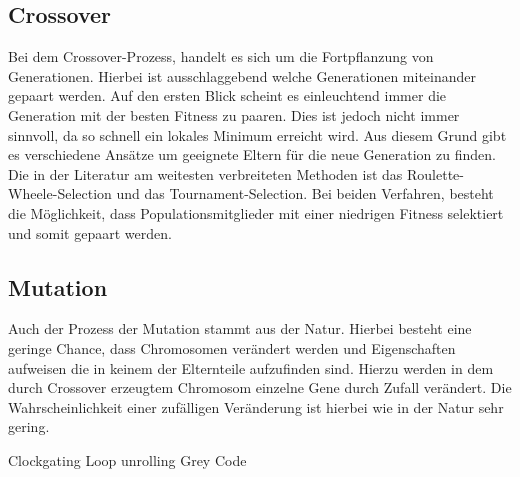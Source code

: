 \subsection{Crossover}
\label{chap:grundlagen_cossover}
Bei dem Crossover-Prozess, handelt es sich um die Fortpflanzung von Generationen. Hierbei ist ausschlaggebend welche Generationen miteinander gepaart werden. Auf den ersten Blick scheint es einleuchtend immer die Generation mit der besten Fitness zu paaren. Dies ist jedoch nicht immer sinnvoll, da so schnell ein lokales Minimum erreicht wird. Aus diesem Grund gibt es verschiedene Ansätze um geeignete Eltern für die neue Generation zu finden.\cite{davis1991handbook}
Die in der Literatur am weitesten verbreiteten Methoden ist das Roulette-Wheele-Selection und das Tournament-Selection.\cite{zhong2005comparison} Bei beiden Verfahren, besteht die Möglichkeit, dass Populationsmitglieder mit einer niedrigen Fitness selektiert und somit gepaart werden.

\subsection{Mutation}
Auch der Prozess der Mutation stammt aus der Natur. Hierbei besteht eine geringe Chance, dass Chromosomen verändert werden und Eigenschaften aufweisen die in keinem der Elternteile aufzufinden sind. Hierzu werden in dem durch Crossover erzeugtem Chromosom einzelne Gene durch Zufall verändert. Die Wahrscheinlichkeit einer zufälligen Veränderung ist hierbei wie in der Natur sehr gering.\cite{davis1991handbook}

Clockgating
Loop unrolling 
Grey Code \cite{su1995cache}


